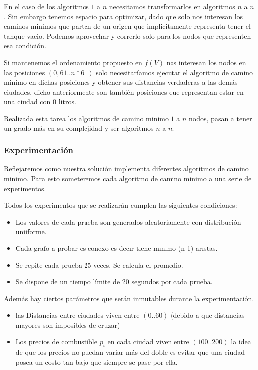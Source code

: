 \documentclass[12pt]{article}
\begin{document}
En el caso de los algoritmos $1$ a $n$ necesitamos transformarlos en algoritmos $n$ a $n$. Sin embargo tenemos espacio para optimizar, dado que solo nos interesan los caminos minimos que parten de un origen que implicitamente representa tener el tanque vacio. Podemos aprovechar y correrlo solo para los nodos que representen esa condición.

Si mantenemos el ordenamiento propuesto en $f(V)$ nos interesan los nodos en las posiciones $(0,61..n*61)$ solo necesitaríamos ejecutar el algoritmo de camino minimo en dichas posiciones y obtener sus distancias verdaderas a las demás ciudades, dicho anteriormente son también posiciones que representan estar en una ciudad con 0 litros. 

Realizada esta tarea los algoritmos de camino minimo $1$ a $n$ nodos, pasan a tener un grado más en su complejidad y ser algoritmos $n$ a $n$.

\subsubsection{Experimentación}

Reflejaremos como nuestra solución implementa diferentes algoritmos de camino minimo. Para esto someteremos cada algoritmo de camino minimo a una serie de experimentos.

Todos los experimentos que se realizarán cumplen las siguientes condiciones:
\begin{itemize}
	\item Los valores de cada prueba son generados aleatoriamente con distribución uniiforme.
	\item Cada grafo a probar es conexo es decir tiene minimo (n-1) aristas.
	\item Se repite cada prueba 25 veces. Se calcula el promedio.
	\item Se dispone de un tiempo límite de 20 segundos por cada prueba.
\end{itemize}

Además hay ciertos parámetros que serán inmutables durante la experimentación.

\begin{itemize}
	\item las Distancias entre ciudades viven entre $(0..60)$ (debido a que distancias mayores son imposibles de cruzar) 
	\item Los precios de combustible $p_i$ en cada ciudad viven entre $(100..200)$ la idea de que los precios no puedan variar más del doble es evitar que una ciudad posea un costo tan bajo que siempre se pase por ella.
\end{itemize}
\end{document}
